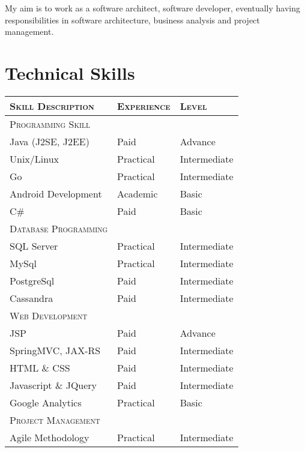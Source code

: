 \documentclass[a4paper,10pt]{article} %
\begin{document}
My aim is to work as a software architect, software developer, eventually having responsibilities in software architecture, business analysis and project management.


\section{Technical Skills}

    \begin{tabular}{l|l|l}
   
    \textsc{Skill Description} & \textsc{Experience}  & \textsc{Level} \\ \hline
    \textsc{Programming Skill}\\ \hline
    Java (J2SE, J2EE) & Paid & Advance \\
    Unix/Linux & Practical & Intermediate \\ 
    Go & Practical & Intermediate \\
    Android Development & Academic & Basic\\
    C\# & Paid & Basic \\ 
    \hline 
    \textsc{Database Programming} \\ \hline
    SQL Server & Practical & Intermediate \\ 
    MySql & Practical & Intermediate \\ 
    PostgreSql & Paid & Intermediate \\ 
    Cassandra & Paid & Intermediate \\ \hline
    \textsc{Web Development} \\ \hline
    JSP & Paid & Advance \\ 
    SpringMVC, JAX-RS & Paid & Intermediate \\ 
    HTML \& CSS & Paid & Intermediate \\ 
    Javascript \& JQuery & Paid & Intermediate \\
    Google Analytics & Practical & Basic \\ 
    \hline
    \textsc{Project Management}\\ \hline
    Agile Methodology & Practical & Intermediate \\ 
    \end{tabular}
\end{document}
